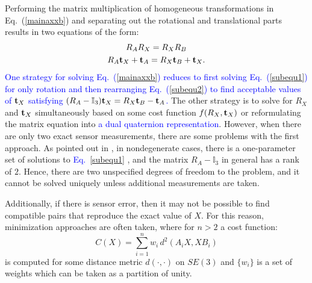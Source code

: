 \documentclass[twocolumn,10pt]{asme2ej}
\newcommand{\ttt}{{\bf t}}
\begin{document}
Performing the matrix multiplication of homogeneous transformations in Eq.~(\ref{mainaxxb}) and separating out the rotational and translational parts results in two equations of the form:
\begin{subequations}
\begin{gather}
R_A R_X = R_X R_B \label{subequ1}\\
R_A {\bf t}_X + {\bf t}_A = R_X {\bf t}_B + {\bf t}_X \label{subequ2}.
\end{gather}
\label{axxb}
\end{subequations}
\textcolor{blue}{One strategy for solving Eq.~(\ref{mainaxxb}) reduces to first solving Eq.~(\ref{subequ1}) for only rotation and then rearranging Eq.~(\ref{subequ2}) to find acceptable values of ${\bf t}_X$ satisfying $ (R_A - \mathbb{I}_{3}) {\bf t}_X = R_X {\bf t}_B - {\bf t}_A$.}
The other strategy is to solve for $R_{X}$ and $\ttt_{X}$ simultaneously based on some cost function $f(R_{X}, \ttt_{X})$ or reformulating the matrix equation into \textcolor{blue}{a dual quaternion representation}. %
However, when there are only two exact sensor measurements, there are some problems with the first  approach. As pointed out in \cite{park1994robot,shiu1989calibration}, in nondegenerate cases, there is a one-parameter set of solutions to \textcolor{blue}{Eq.~\ref{subequ1}}%
, and the matrix $R_A - \mathbb{I}_{3}$ in general has a rank of $2$. Hence, there are two unspecified degrees of freedom to the
problem, and it cannot be solved uniquely unless additional measurements are taken. 

Additionally, if there is sensor error, then it may not be possible to find compatible pairs that reproduce the exact value of $X$. For this reason, minimization approaches are often taken, where for $n>2$ a cost function:
\begin{equation}
C(X) = \sum_{i=1}^{n} w_i \, d^2(A_i X,X B_i)
\label{mainaxxb2}
\end{equation}
is computed for some distance metric $d(\cdot,\cdot)$ on $SE(3)$ and $\{w_i\}$ is a set of weights which can be taken as a partition of unity. 
\end{document}
